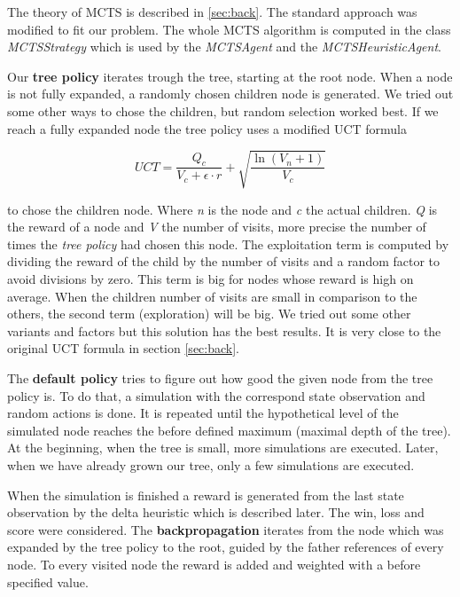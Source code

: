 The theory of \ac{MCTS} is described in \cref{sec:back}. The standard approach was modified to fit our problem. The whole \ac{MCTS} algorithm is computed in the class \textit{MCTSStrategy} which is used by the \textit{MCTSAgent} and the \textit{MCTSHeuristicAgent}.

Our \textbf{tree policy} iterates trough the tree, starting at the root node. When a node is not fully expanded, a randomly chosen children node is generated. We tried out some other ways to chose the children, but random selection worked best. If we reach a fully expanded node the tree policy uses a modified \ac{UCT} formula

\begin{equation}
 	UCT = \frac{Q_c}{V_c + \epsilon \cdot r} + \sqrt{\frac{\ln{(V_n +1)}}{V_c}}
\end{equation} 

to chose the children node. Where \textit{n} is the node and \textit{c} the actual children. \textit{Q} is the reward of a node and \textit{V} the number of visits, more precise the number of times the \textit{tree policy} had chosen this node. The exploitation term is computed by dividing the reward of the child by the number of visits and a random factor to avoid divisions by zero. This term is big for nodes whose reward is high on average.
When the children number of visits are small in comparison to the others, the second term (exploration) will be big. We tried out some other variants and factors but this solution has the best results. It is very close to the original \ac{UCT} formula in section \ref{sec:back}.

The \textbf{default policy} tries to figure out how good the given node from the tree policy is. To do that, a simulation with the correspond state observation and random actions is done. It is repeated until the hypothetical level of the simulated node reaches the before defined maximum (maximal depth of the tree). At the beginning, when the tree is small, more simulations are executed. Later, when we have already grown our tree, only a few simulations are executed.

When the simulation is finished a reward is generated from the last state observation by the delta heuristic which is described later. The win, loss and score were considered.
The \textbf{backpropagation} iterates from the node which was expanded by the tree policy to the root, guided by the father references of every node. To every visited node the reward is added and weighted with a before specified value.


